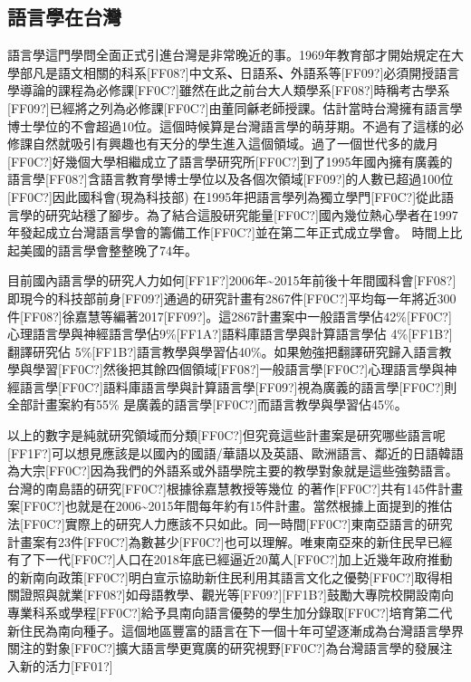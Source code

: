 \subsection{語言學在台灣} %

語言學這門學問全面正式引進台灣是非常晚近的事。1969年教育部才開始規定在大學部凡是語文相關的科系[FF08?]中文系\textbf{、}日語系\textbf{、}外語系等[FF09?]必須開授語言學導論的課程為必修課[FF0C?]雖然在此之前台大人類學系[FF08?]時稱考古學系[FF09?]已經將之列為必修課[FF0C?]由董同龢老師授課。估計當時台灣擁有語言學博士學位的不會超過10位。這個時候算是台灣語言學的萌芽期。不過有了這樣的必修課自然就吸引有興趣也有天分的學生進入這個領域。過了一個世代多的歲月[FF0C?]好幾個大學相繼成立了語言學研究所[FF0C?]到了1995年國內擁有廣義的語言學[FF08?]含語言教育學博士學位以及各個次領域[FF09?]的人數已超過100位[FF0C?]因此國科會(現為科技部) 在1995年把語言學列為獨立學門[FF0C?]從此語言學的研究站穩了腳步。為了結合這股研究能量[FF0C?]國內幾位熱心學者在1997年發起成立台灣語言學會的籌備工作[FF0C?]並在第二年正式成立學會。 時間上比起美國的語言學會整整晚了74年。

目前國內語言學的研究人力如何[FF1F?]2006年{\textasciitilde}2015年前後十年間國科會[FF08?]即現今的科技部前身[FF09?]通過的研究計畫有2867件[FF0C?]平均每一年將近300件[FF08?]徐嘉慧等編著2017[FF09?]。這2867計畫案中一般語言學佔42\%[FF0C?]心理語言學與神經語言學佔9\%[FF1A?]語料庫語言學與計算語言學佔 4\%[FF1B?]翻譯研究佔 5\%[FF1B?]語言教學與學習佔40\%。如果勉強把翻譯研究歸入語言教學與學習[FF0C?]然後把其餘四個領域[FF08?]一般語言學[FF0C?]心理語言學與神經語言學[FF0C?]語料庫語言學與計算語言學[FF09?]視為廣義的語言學[FF0C?]則全部計畫案約有55\% 是廣義的語言學[FF0C?]而語言教學與學習佔45\%。

以上的數字是純就研究領域而分類[FF0C?]但究竟這些計畫案是研究哪些語言呢[FF1F?]可以想見應該是以國內的國語/華語以及英語、歐洲語言、鄰近的日語韓語為大宗[FF0C?]因為我們的外語系或外語學院主要的教學對象就是這些強勢語言。台灣的南島語的研究[FF0C?]根據徐嘉慧教授等幾位  的著作[FF0C?]共有145件計畫案[FF0C?]也就是在2006{\textasciitilde}2015年間每年約有15件計畫。當然根據上面提到的推估法[FF0C?]實際上的研究人力應該不只如此。同一時間[FF0C?]東南亞語言的研究計畫案有23件[FF0C?]為數甚少[FF0C?]也可以理解。唯東南亞來的新住民早已經有了下一代[FF0C?]人口在2018年底已經逼近20萬人[FF0C?]加上近幾年政府推動的新南向政策[FF0C?]明白宣示協助新住民利用其語言文化之優勢[FF0C?]取得相關證照與就業[FF08?]如母語教學、觀光等[FF09?][FF1B?]鼓勵大專院校開設南向專業科系或學程[FF0C?]給予具南向語言優勢的學生加分錄取[FF0C?]培育第二代新住民為南向種子。這個地區豐富的語言在下一個十年可望逐漸成為台灣語言學界關注的對象[FF0C?]擴大語言學更寬廣的研究視野[FF0C?]為台灣語言學的發展注入新的活力[FF01?]

